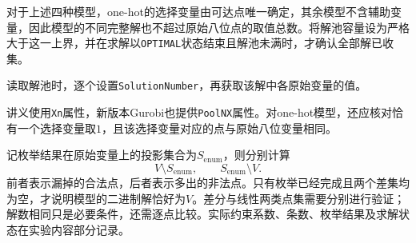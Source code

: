 对于上述四种模型，one-hot的选择变量由可达点唯一确定，其余模型不含辅助变量，因此模型的不同完整解也不超过原始八位点的取值总数。将解池容量设为严格大于这一上界，并在求解以\texttt{OPTIMAL}状态结束且解池未满时，才确认全部解已收集。

读取解池时，逐个设置\texttt{SolutionNumber}，再获取该解中各原始变量的值。

讲义使用\texttt{Xn}属性，新版本Gurobi也提供\texttt{PoolNX}属性。对one-hot模型，还应核对恰有一个选择变量取$1$，且该选择变量对应的点与原始八位变量相同。

记枚举结果在原始变量上的投影集合为$S_{\mathrm{enum}}$，则分别计算
\[
V\setminus S_{\mathrm{enum}},
\qquad
S_{\mathrm{enum}}\setminus V.
\]
前者表示漏掉的合法点，后者表示多出的非法点。只有枚举已经完成且两个差集均为空，才说明模型的二进制解恰好为$V$。差分与线性两类点集需要分别进行验证；解数相同只是必要条件，还需逐点比较。实际约束系数、条数、枚举结果及求解状态在实验内容部分记录。
